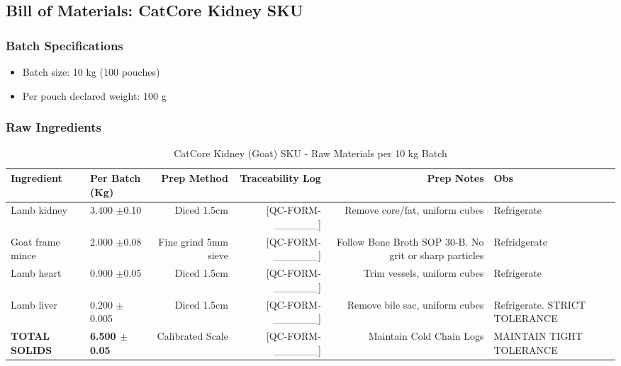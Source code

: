 \subsection*{Bill of Materials: CatCore Kidney SKU}
\label{bom:catcore_heart}

\subsubsection*{Batch Specifications}
\begin{itemize}
\item Batch size: 10 kg (100 pouches)
\item Per pouch declared weight: 100 g
\end{itemize}

\subsubsection*{Raw Ingredients}
\begin{table}[h]
\centering
\caption{CatCore Kidney (Goat) SKU - Raw Materials per 10 kg Batch}
\begin{tabular}{@{}llrrrp{4cm}@{}}
\toprule
\textbf{Ingredient} & \textbf{Per Batch (Kg)} & \textbf{Prep Method}  & \textbf{Traceability Log} & \textbf{Prep Notes} & \textbf{Obs}\\
\midrule
Lamb kidney         & 3.400 $\pm$0.10  & Diced 1.5cm            & [QC-FORM-\_\_\_\_\_\_] & Remove core/fat, uniform cubes & Refrigerate\\
Goat frame mince    & 2.000 $\pm$0.08  & Fine grind 5mm sieve   & [QC-FORM-\_\_\_\_\_\_] & Follow Bone Broth SOP 30-B. No grit or sharp particles & Refridgerate  \\
Lamb heart          & 0.900 $\pm$0.05  & Diced 1.5cm            & [QC-FORM-\_\_\_\_\_\_] & Trim vessels, uniform cubes & Refrigerate\\
Lamb liver          & 0.200 $\pm$0.005 & Diced 1.5cm            & [QC-FORM-\_\_\_\_\_\_] & Remove bile sac, uniform cubes & Refrigerate. STRICT TOLERANCE\\
\midrule
\textbf{TOTAL SOLIDS} & \textbf{6.500 $\pm$0.05} & Calibrated Scale & [QC-FORM-\_\_\_\_\_\_] & Maintain Cold Chain Logs & MAINTAIN TIGHT TOLERANCE\\
\bottomrule
\end{tabular}
\end{table}

